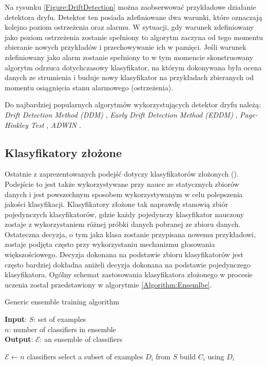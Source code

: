 \noindent Na rysunku \ref{Figure:DriftDetection} można zaobserwować przykładowe działanie detektora dryfu. Detektor ten posiada zdefiniowane dwa warunki, które oznaczają kolejno poziom ostrzeżenia oraz alarmu. W sytuacji, gdy warunek zdefiniowany jako poziom ostrzeżenia zostanie spełniony to algorytm zaczyna od tego momentu zbieranie nowych przykładów i przechowywanie ich w pamięci. Jeśli warunek zdefiniowany jako alarm zostanie spełniony to w tym momencie skonstruowany algorytm odrzuca dotychczasowy klasyfikator, na którym dokonywana była ocena danych ze strumienia i buduje nowy klasyfikator na przykładach zbieranych od momentu osiągnięcia stanu alarmowego (ostrzeżenia).

Do najbardziej popularnych algorytmów wykorzystujących detektor dryfu należą: \textit{Drift Detection Method (DDM)} \cite{Article:DriftDetection}, \textit{Early Drift Detection Method (EDDM)} \cite{Article:DriftDetection2}, \textit{Page-Hinkley Test} \cite{Article:PageHinkley}, \textit{ADWIN} \cite{Article:ADWIN}.

\subsection{Klasyfikatory złożone}

\noindent Ostatnie z zaprezentowanych podejść dotyczy klasyfikatorów złożonych (). Podejście to jest także wykorzystywane przy nauce ze statycznych zbiorów danych i jest powszechnym sposobem wykorzystywanym w celu polepszenia jakości klasyfikacji. Klasyfikatory złożone tak naprawdę stanowią zbiór pojedynczych klasyfikatorów, gdzie każdy pojedynczy klasyfikator nauczony zostaje z wykorzystaniem różnej próbki danych pobranej ze zbioru danych. Ostateczna decyzja, o tym jaka klasa zostanie przypisana nowemu przykładowi, zostaje podjęta często przy wykorzystaniu mechanizmu głosowania większościowego. Decyzja dokonana na podstawie zbioru klasyfikatorów jest często bardziej dokładna aniżeli decyzja dokonana na podstawie pojedynczego klasyfikatora. Ogólny schemat zastosowania klasyfikatora złożonego w procesie uczenia został przedstawiony w algorytmie \ref{Algorithm:Ensemlbe}.

\begin{algorithm}
    \caption{Generic ensemble training algorithm \cite{PHD:Kirkby}}\label{Algorithm:Ensemlbe}
    \textbf{Input}: $S$: set of examples \\
    \hspace*{12mm} $n$: number of classifiers in ensemble \\
    \textbf{Output}: $\mathcal{E}$: an ensemble of classifiers \\
    \begin{algorithmic}[1]
    \State $\mathcal{E} \gets n$ classifiers
    \State select a subset of examples $D_i$ from $S$
    \State build $C_i$ using $D_i$
    \EndFor
    \end{algorithmic}
\end{algorithm}

